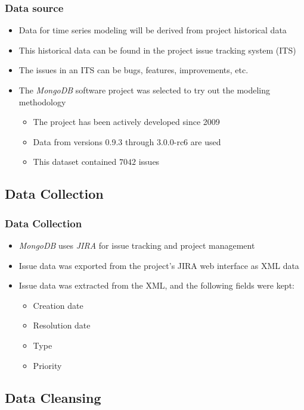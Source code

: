 \documentclass[presentation]{beamer}
\begin{document}
\begin{frame}[t]
\frametitle{Data source}
\begin{itemize}
\item{Data for time series modeling will be derived from project historical data}
\item{This historical data can be found in the project issue tracking system (ITS)}
\item{The issues in an ITS can be bugs, features, improvements, etc.}
\item{The \textit{MongoDB} software project was selected to try out the modeling methodology
\begin{itemize}
\item{The project has been actively developed since 2009}
\item{Data from versions 0.9.3 through 3.0.0-rc6 are used}
\item{This dataset contained $7042$ issues}
\end{itemize}
}
\end{itemize}
\end{frame}

\subsection{Data Collection}

\begin{frame}[t]
\frametitle{Data Collection}
\begin{itemize}
\item{\textit{MongoDB} uses \textit{JIRA} for issue tracking and project management}
\item{Issue data was exported from the project's JIRA web interface as XML data}
\item{Issue data was extracted from the XML, and the following fields were kept:
  \begin{itemize}
  \item{Creation date}\item{Resolution date}\item{Type}\item{Priority}
  \end{itemize}
}
\end{itemize}
\end{frame}

\subsection{Data Cleansing}
\end{document}
